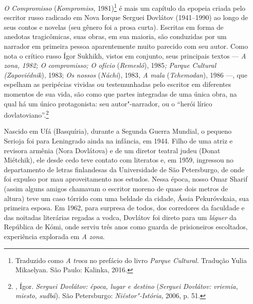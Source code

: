 \clearpage
\thispagestyle{empty}

\movetoevenpage
\pagebreak
\begin{center}
{}
\end{center}
\label{posfacio}

\bigskip

\emph{O Compromisso} (\emph{Kompromiss,} 1981)\footnote{Traduzido como
  \emph{A troca} no prefácio do livro \emph{Parque Cultural.} Tradução
  Yulia Mikaelyan. São Paulo: Kalinka, 2016.} é mais um capítulo da
epopeia criada pelo escritor russo radicado em Nova Iorque Serguei
Dovlátov (1941--1990) ao longo de seus contos e novelas (seu gênero foi
a prosa curta). Escritas em forma de anedotas tragicômicas, suas obras,
em sua maioria, são conduzidas por um narrador em primeira pessoa
aparentemente muito parecido com seu autor. Como nota o crítico russo
Ígor Sukhikh, vistos em conjunto, seus principais textos --- \emph{A
zona, 1982; O compromisso; O ofício} (\emph{Remesló}),
1985\emph{; Parque Cultural (Zapoviédnik}), 1983; \emph{Os
nossos} (\emph{Náchi}), 1983\emph{, A mala}
(\emph{Tchemodan}), 1986 ---, que espelham as peripécias vividas
ou testemunhadas pelo escritor em diferentes momentos de sua vida, são como
que partes integradas de uma única obra, na qual há um único
protagonista: seu autor"-narrador, ou o ``herói lírico
dovlatoviano''.\footnote{, Ígor. \emph{Serguei Dovlátov: época,
  lugar e destino} (\emph{Serguei Dovlátov: vriemia, miesto, sudbá}). São
  Petersburgo: \emph{Niéstor"-Istória}, 2006, p. 51.}

Nascido em Ufá (Basquíria), durante a Segunda Guerra Mundial, o pequeno
Serioja foi para Leningrado ainda na infância, em 1944. Filho de uma
atriz e revisora armênia (Nora Dovlátova) e de um diretor teatral judeu (Donat Miétchik), ele desde cedo
teve contato com literatos e, em 1959, ingressou no departamento de
letras finlandesas da Universidade de São Petersburgo, de onde foi
expulso por mau aproveitamento nos estudos. Nessa época, nosso Omar
Sharif (assim alguns amigos chamavam o escritor moreno de quase dois
metros de altura) teve um caso tórrido com uma beldade da cidade, Ássia
Pekuróvskaia, sua primeira esposa. Em 1962, para surpresa de todos, dos
corredores da faculdade e das noitadas literárias regadas a vodca,
Dovlátov foi direto para um \emph{láguer} da República de Kómi, onde
serviu três anos como guarda de prisioneiros escoltados, experiência
explorada em \emph{A zona}.

